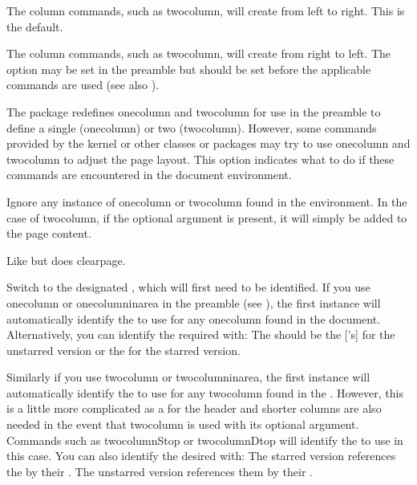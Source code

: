 \documentclass[fontsize=12pt]{scrbook}
\begin{document}

The column commands, such as \gls{twocolumn}, will
create  from left to right. This is the default.


The column commands, such as \gls{twocolumn}, will
create  from right to left. The  option may be set
in the preamble but should be set before the applicable commands are
used (see also ).


The  package redefines \gls{onecolumn} and
\gls{twocolumn} for use in the preamble to define a single
 (\gls{onecolumn}) or two 
(\gls{twocolumn}). However, some commands provided by the kernel or
other classes or packages may try to use \gls{onecolumn} and
\gls{twocolumn} to adjust the page layout. This option indicates
what to do if these commands are encountered in the document
environment.


Ignore any instance of \gls{onecolumn} or \gls{twocolumn}
found in the  environment. In the case of
\gls{twocolumn}, if the optional argument is present, it will simply
be added to the page content.


Like  but does \gls{clearpage}.


Switch to the designated , which will first need to be
identified. If you use \gls{onecolumn} or
\gls{onecolumninarea} in the preamble (see
), the first instance will automatically
identify the  to use for any \gls{onecolumn} found
in the document.  Alternatively, you can identify the required
 with:
The  should be the ['s]  for the
unstarred version or the  for the starred version.

Similarly if you use \gls{twocolumn} or 
\gls{twocolumninarea}, the first instance will automatically
identify the  to use for any \gls{twocolumn} found
in the . However, this is a little more complicated as
a  for the header and shorter columns are also needed in
the event that \gls{twocolumn} is used with its optional argument.
Commands such as \gls{twocolumnStop} or \gls{twocolumnDtop} 
will identify the  to use in this case.
You can also identify the desired  with:
The starred version references the  by their .
The unstarred version references them by their .
\end{document}

